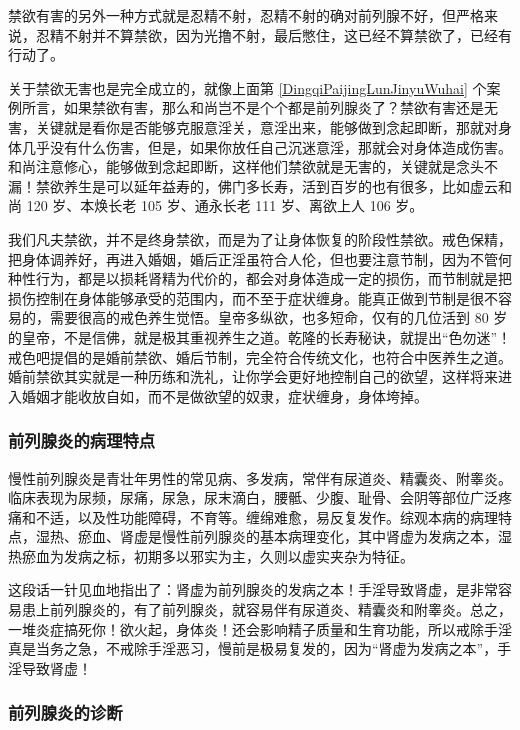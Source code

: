 \documentclass{ctexart}
\begin{document}
禁欲有害的另外一种方式就是忍精不射，忍精不射的确对前列腺不好，但严格来说，忍精不射并不算禁欲，因为光撸不射，最后憋住，这已经不算禁欲了，已经有行动了。

关于禁欲无害也是完全成立的，就像上面第 \ref{DingqiPaijingLunJinyuWuhai} 个案例所言，如果禁欲有害，那么和尚岂不是个个都是前列腺炎了？禁欲有害还是无害，关键就是看你是否能够克服意淫关，意淫出来，能够做到念起即断，那就对身体几乎没有什么伤害，但是，如果你放任自己沉迷意淫，那就会对身体造成伤害。和尚注意修心，能够做到念起即断，这样他们禁欲就是无害的，关键就是念头不漏！禁欲养生是可以延年益寿的，佛门多长寿，活到百岁的也有很多，比如虚云和尚 120 岁、本焕长老 105 岁、通永长老 111 岁、离欲上人 106 岁。

我们凡夫禁欲，并不是终身禁欲，而是为了让身体恢复的阶段性禁欲。戒色保精，把身体调养好，再进入婚姻，婚后正淫虽符合人伦，但也要注意节制，因为不管何种性行为，都是以损耗肾精为代价的，都会对身体造成一定的损伤，而节制就是把损伤控制在身体能够承受的范围内，而不至于症状缠身。能真正做到节制是很不容易的，需要很高的戒色养生觉悟。皇帝多纵欲，也多短命，仅有的几位活到 80 岁的皇帝，不是信佛，就是极其重视养生之道。乾隆的长寿秘诀，就提出“色勿迷”！戒色吧提倡的是婚前禁欲、婚后节制，完全符合传统文化，也符合中医养生之道。婚前禁欲其实就是一种历练和洗礼，让你学会更好地控制自己的欲望，这样将来进入婚姻才能收放自如，而不是做欲望的奴隶，症状缠身，身体垮掉。

\subsubsection{前列腺炎的病理特点}

慢性前列腺炎是青壮年男性的常见病、多发病，常伴有尿道炎、精囊炎、附睾炎。临床表现为尿频，尿痛，尿急，尿末滴白，腰骶、少腹、耻骨、会阴等部位广泛疼痛和不适，以及性功能障碍，不育等。缠绵难愈，易反复发作。综观本病的病理特点，湿热、瘀血、肾虚是慢性前列腺炎的基本病理变化，其中肾虚为发病之本，湿热瘀血为发病之标，初期多以邪实为主，久则以虚实夹杂为特征。

这段话一针见血地指出了：肾虚为前列腺炎的发病之本！手淫导致肾虚，是非常容易患上前列腺炎的，有了前列腺炎，就容易伴有尿道炎、精囊炎和附睾炎。总之，一堆炎症搞死你！欲火起，身体炎！还会影响精子质量和生育功能，所以戒除手淫真是当务之急，不戒除手淫恶习，慢前是极易复发的，因为“肾虚为发病之本”，手淫导致肾虚！

\subsubsection{前列腺炎的诊断}
\end{document}

